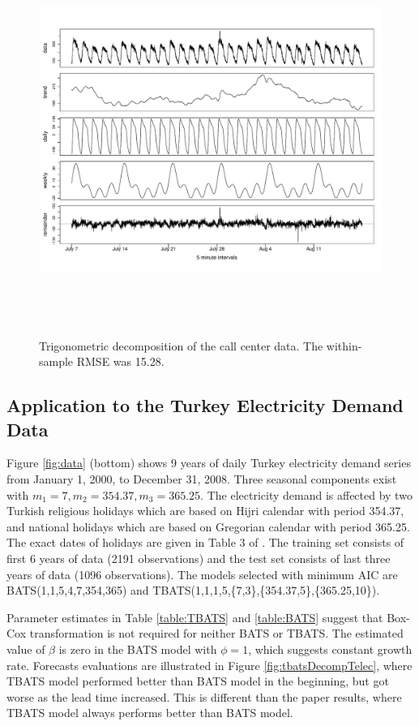 \documentclass{uwstat572}
\begin{document}
\begin{figure}[]
\centering
  \includegraphics[width=\linewidth,height=5in]{tbatsDecompCalls.pdf}
  \caption{Trigonometric decomposition of the call center data. The within-sample RMSE was 15.28.}
  \label{fig:tbatsDecompCalls}
\end{figure}


\subsection{Application to the Turkey Electricity Demand Data}
\hspace{4ex}Figure \ref{fig:data} (bottom) shows 9 years of daily Turkey electricity demand series from January 1, 2000, to December 31, 2008. Three seasonal components exist with $m_1=7, m_2=354.37, m_3=365.25$. The electricity demand is affected by two Turkish religious holidays which are based on Hijri calendar with period 354.37, and national holidays which are based on Gregorian calendar with period 365.25. The exact dates of holidays are given in Table 3 of \citet{de2011forecasting}. The training set consists of first 6 years of data (2191 observations) and the test set consists of last three years of data (1096 observations). The models selected with minimum AIC are BATS(1,1,5,4,7,354,365) and TBATS(1,1,1,5,\{7,3\},\{354.37,5\},\{365.25,10\}).

Parameter estimates in Table \ref{table:TBATS} and \ref{table:BATS} suggest that Box-Cox transformation is not required for neither BATS or TBATS. The estimated value of $\beta$ is zero in the BATS model with $\phi=1$, which suggests constant growth rate. Forecasts evaluations are illustrated in Figure \ref{fig:tbatsDecompTelec}, where TBATS model performed better than BATS model in the beginning, but got worse as the lead time increased. This is different than the paper results, where TBATS model always performs better than BATS model.
\end{document}
